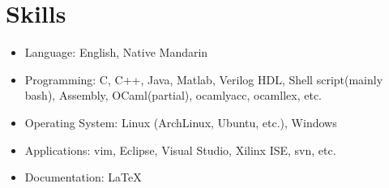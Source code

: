 \documentclass[letterpaper]{article}
\begin{document}
\section*{Skills}
\begin{itemize}
\item Language: English, Native Mandarin
\item Programming: C, C++, Java, Matlab, Verilog HDL, Shell script(mainly bash), Assembly, OCaml(partial), ocamlyacc, ocamllex, etc.
\item Operating System: Linux (ArchLinux, Ubuntu, etc.), Windows
\item Applications: vim, Eclipse, Visual Studio, Xilinx ISE, svn, etc.
\item Documentation: \LaTeX
\end{itemize}
\end{document}
